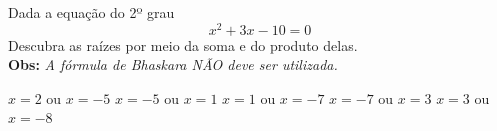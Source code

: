Dada a equação do 2º grau
\[x^2+3x-10=0\]
Descubra as raízes por meio da soma e do produto delas.\\{\bf Obs: }{\it A fórmula de Bhaskara NÃO deve ser utilizada.}

$x=2$ ou $x=-5$
$x=-5$ ou $x=1$
$x=1$ ou $x=-7$
$x=-7$ ou $x=3$
$x=3$ ou $x=-8$



